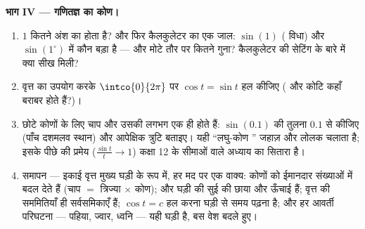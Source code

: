 \begin{problem}
\medskip
\noindent\textbf{भाग IV --- गणितज्ञ का कोण।}
\begin{enumerate}[resume]
  \item $1$  कितने अंश का होता है? और फिर कैलकुलेटर का एक जाल:
        $\sin(1)$ ( विधा) और $\sin(1^\circ)$ में कौन बड़ा है --- और मोटे तौर पर
        कितने गुना? कैलकुलेटर की सेटिंग के बारे में क्या सीख मिली?
  \item वृत्त का उपयोग करके $\intco{0}{2\pi}$ पर $\cos t = \sin t$ हल कीजिए ( और कोटि कहाँ बराबर
        होते हैं?)।
  \item छोटे कोणों के लिए चाप और उसकी  लगभग एक ही होते हैं: $\sin(0.1)$ की
        तुलना $0.1$ से कीजिए (पाँच दशमलव स्थान) और आपेक्षिक त्रुटि बताइए।
        यही ``लघु-कोण '' जहाज़ और लोलक चलाता है; इसके पीछे की प्रमेय
        ($\frac{\sin t}{t} \to 1$) कक्षा 12 के सीमाओं वाले अध्याय का सितारा है।
  \item समापन --- इकाई वृत्त मुख्य घड़ी के रूप में, हर मद पर एक वाक्य:
         कोणों को ईमानदार संख्याओं में बदल देते हैं (चाप $=$
        त्रिज्या $\times$ कोण);  और  घड़ी की सुई की छाया और ऊँचाई
        हैं; वृत्त की सममितियाँ ही सर्वसमिकाएँ हैं; $\cos t = c$ हल करना घड़ी से
        समय पढ़ना है; और हर आवर्ती परिघटना --- पहिया, ज्वार, ध्वनि ---
        यही घड़ी है, बस वेश बदले हुए।
\end{enumerate}
\end{problem}
